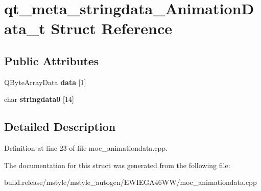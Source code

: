 \hypertarget{structqt__meta__stringdata___animation_data__t}{}\section{qt\+\_\+meta\+\_\+stringdata\+\_\+\+Animation\+Data\+\_\+t Struct Reference}
\label{structqt__meta__stringdata___animation_data__t}
\subsection*{Public Attributes}
\begin{DoxyCompactItemize}
\item 
\mbox{\label{structqt__meta__stringdata___animation_data__t_a47355d74f86bcf039b440899a1477200}} 
Q\+Byte\+Array\+Data {\bfseries data} \mbox{[}1\mbox{]}
\item 
\mbox{\label{structqt__meta__stringdata___animation_data__t_a8382b6edc3807f10aad77139741f1256}} 
char {\bfseries stringdata0} \mbox{[}14\mbox{]}
\end{DoxyCompactItemize}


\subsection{Detailed Description}


Definition at line 23 of file moc\+\_\+animationdata.\+cpp.



The documentation for this struct was generated from the following file\+:\begin{DoxyCompactItemize}
\item 
build.\+release/mstyle/mstyle\+\_\+autogen/\+E\+W\+I\+E\+G\+A46\+W\+W/moc\+\_\+animationdata.\+cpp\end{DoxyCompactItemize}
